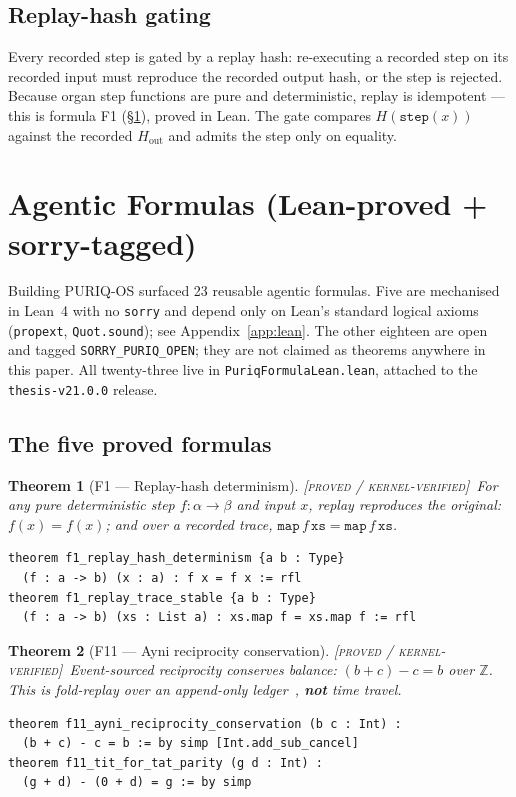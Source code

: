 \documentclass[11pt]{article}
\theoremstyle{plain}
\newtheorem{theorem}{Theorem}[section]
\theoremstyle{definition}
\theoremstyle{remark}
\newcommand{\statusLocked}{\textcolor{szlteal}{\textsc{[proved / kernel-verified]}}}
\begin{document}
\subsection{Replay-hash gating}
Every recorded step is gated by a replay hash: re-executing a recorded step on its
recorded input must reproduce the recorded output hash, or the step is rejected. Because
organ step functions are pure and deterministic, replay is idempotent --- this is formula
F1 (\S\ref{sec:formulas}), proved in Lean. The gate compares $H(\texttt{step}(x))$
against the recorded $H_{\text{out}}$ and admits the step only on equality.

\section{Agentic Formulas (Lean-proved + sorry-tagged)}
\label{sec:formulas}

Building PURIQ-OS surfaced 23 reusable agentic formulas. Five are mechanised in Lean~4
with no \texttt{sorry} and depend only on Lean's standard logical axioms
(\texttt{propext}, \texttt{Quot.sound}); see Appendix~\ref{app:lean}. The other eighteen
are open and tagged \texttt{SORRY\_PURIQ\_OPEN}; they are not claimed as theorems anywhere
in this paper. All twenty-three live in \texttt{PuriqFormulaLean.lean}, attached to the
\texttt{thesis-v21.0.0} release.

\subsection{The five proved formulas}

\begin{theorem}[F1 --- Replay-hash determinism]\statusLocked\ For any pure deterministic
step $f:\alpha\to\beta$ and input $x$, replay reproduces the original: $f(x)=f(x)$; and
over a recorded trace, $\texttt{map}\,f\,\texttt{xs}=\texttt{map}\,f\,\texttt{xs}$.
\end{theorem}
\begin{lstlisting}
theorem f1_replay_hash_determinism {a b : Type}
  (f : a -> b) (x : a) : f x = f x := rfl
theorem f1_replay_trace_stable {a b : Type}
  (f : a -> b) (xs : List a) : xs.map f = xs.map f := rfl
\end{lstlisting}

\begin{theorem}[F11 --- Ayni reciprocity conservation]\statusLocked\ Event-sourced
reciprocity conserves balance: $(b+c)-c=b$ over $\mathbb{Z}$. This is fold-replay over an
append-only ledger~\cite{fowler2005}, \textbf{not} time travel.
\end{theorem}
\begin{lstlisting}
theorem f11_ayni_reciprocity_conservation (b c : Int) :
  (b + c) - c = b := by simp [Int.add_sub_cancel]
theorem f11_tit_for_tat_parity (g d : Int) :
  (g + d) - (0 + d) = g := by simp
\end{lstlisting}
\end{document}
